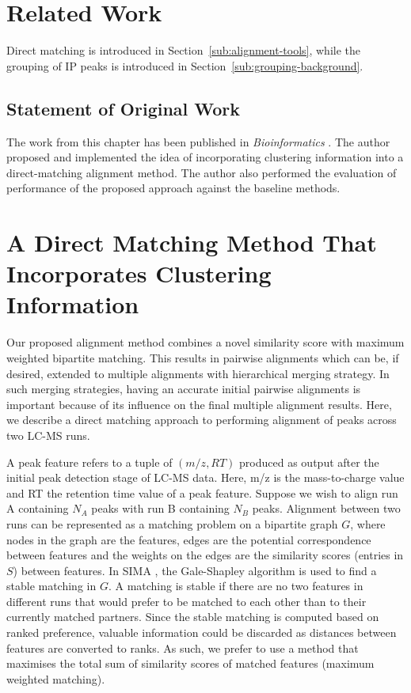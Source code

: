 \section{Related Work}

Direct matching is introduced in Section~\ref{sub:alignment-tools}, while the grouping of IP peaks is introduced in Section~\ref{sub:grouping-background}. 

\subsection*{Statement of Original Work}

The work from this chapter has been published in \textit{Bioinformatics} \cite{wandy2015incorporating}. The author proposed and implemented the idea of incorporating clustering information into a direct-matching alignment method. The author also performed the evaluation of performance of the proposed approach against the baseline methods. 

\section{A Direct Matching Method That Incorporates Clustering Information\label{sub:direct-matching}}

Our proposed alignment method combines a novel similarity score with maximum weighted bipartite matching. This results in pairwise alignments which can be, if desired, extended to multiple alignments with hierarchical merging strategy. In such merging strategies, having an accurate initial pairwise alignments is important because of its influence on the final multiple alignment results. Here, we describe a direct matching approach to performing alignment of peaks across two LC-MS runs. 

A peak feature refers to a tuple of $(m/z,RT)$ produced as output after the initial peak detection stage of LC-MS data. Here, m/z is the mass-to-charge value and RT the retention time value of a peak feature. Suppose we wish to align run A containing $N_A$ peaks with run B containing $N_B$ peaks.  Alignment between two runs can be represented as a matching problem on a bipartite graph $G$, where nodes in the graph are the features, edges are the potential correspondence between features and the weights on the edges are the similarity scores (entries in $S$) between features. In SIMA \cite{Voss2011a}, the Gale-Shapley algorithm \cite{Gusfield1989} is used to find a stable matching in $G$. A matching is stable if there are no two features in different runs that would prefer to be matched to each other than to their currently matched partners. Since the stable matching is computed based on ranked preference, valuable information could be discarded as distances between features are converted to ranks. As such, we prefer to use a method that maximises the total sum of similarity scores of matched features (maximum weighted matching).

